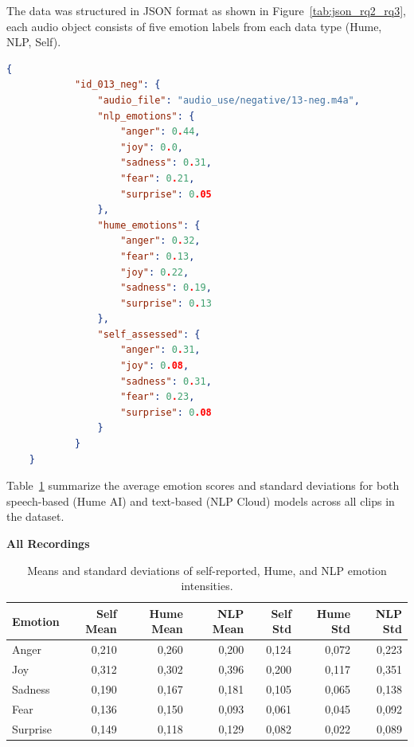 The data was structured in JSON format as shown in Figure~\ref{tab:json_rq2_rq3}, each audio object consists of five emotion labels from each data type (Hume, NLP, Self). 

\begin{center}
    \begin{minipage}{0.7\textwidth} 
    \begin{lstlisting}[language=json, caption={Example of stored JSON structure for Hume, NLP, Self-labeling.}]
        {
            "id_013_neg": {
                "audio_file": "audio_use/negative/13-neg.m4a",
                "nlp_emotions": {
                    "anger": 0.44,
                    "joy": 0.0,
                    "sadness": 0.31,
                    "fear": 0.21,
                    "surprise": 0.05
                },
                "hume_emotions": {
                    "anger": 0.32,
                    "fear": 0.13,
                    "joy": 0.22,
                    "sadness": 0.19,
                    "surprise": 0.13
                },
                "self_assessed": {
                    "anger": 0.31,
                    "joy": 0.08,
                    "sadness": 0.31,
                    "fear": 0.23,
                    "surprise": 0.08
                }
            }
    }
    \end{lstlisting}
    \label{tab:json_rq2_rq3}
\end{minipage}
\end{center} 

Table~\ref{tab:rq3_emotion-stats-combined} summarize the average emotion scores and standard deviations for both speech-based (Hume AI) and text-based (NLP Cloud) 
models across all clips in the dataset. 

\begin{table}[H]
    \centering
    \caption*{\textbf{All Recordings}}
    \begin{tabular}{lrrrrrr}
      \toprule
      \textbf{Emotion} & \textbf{Self Mean} & \textbf{Hume Mean} & \textbf{NLP Mean} & \textbf{Self Std} & \textbf{Hume Std} & \textbf{NLP Std} \\
      \midrule
      Anger    & 0,210 & 0,260 & 0,200 & 0,124 & 0,072 & 0,223 \\
      Joy      & 0,312 & 0,302 & 0,396 & 0,200 & 0,117 & 0,351 \\
      Sadness  & 0,190 & 0,167 & 0,181 & 0,105 & 0,065 & 0,138 \\
      Fear     & 0,136 & 0,150 & 0,093 & 0,061 & 0,045 & 0,092 \\
      Surprise & 0,149 & 0,118 & 0,129 & 0,082 & 0,022 & 0,089 \\
      \bottomrule
    \end{tabular}
    \caption{Means and standard deviations of self-reported, Hume, and NLP emotion intensities.}
    \label{tab:rq3_emotion-stats-combined}
  \end{table}
  
